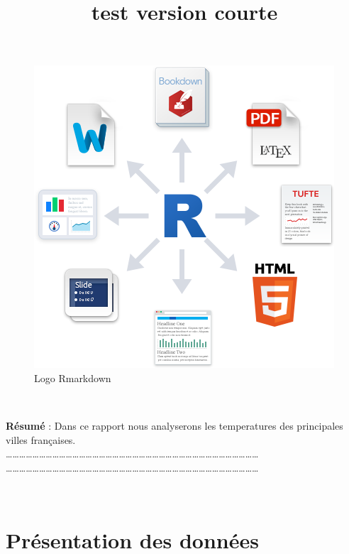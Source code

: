 \documentclass[
]{article}
\title{test version courte}
\author{}
\date{\vspace{-2.5em}}
\begin{document}
\maketitle

{
\setcounter{tocdepth}{3}
\tableofcontents
}
\begin{figure}[h]

{\centering \includegraphics[width=1\linewidth]{rmarkdown} 

}

\caption{Logo Rmarkdown}\label{fig:logo}
\end{figure}

~

\textbf{Résumé} : Dans ce rapport nous analyserons les temperatures des
principales villes françaises.\\
\ldots\ldots\ldots\ldots\ldots\ldots\ldots\ldots\ldots\ldots\ldots\ldots\ldots\ldots\ldots\ldots\ldots\ldots\ldots\ldots\ldots\ldots\ldots\ldots\ldots\ldots\ldots\ldots\ldots\ldots\ldots\ldots\ldots\ldots\ldots\ldots\ldots\ldots{}
\ldots\ldots\ldots\ldots\ldots\ldots\ldots\ldots\ldots\ldots\ldots\ldots\ldots\ldots\ldots\ldots\ldots\ldots\ldots\ldots\ldots\ldots\ldots\ldots\ldots\ldots\ldots\ldots\ldots\ldots\ldots\ldots\ldots\ldots\ldots\ldots\ldots\ldots{}

~

\hypertarget{pruxe9sentation-des-donnuxe9es}{%
\section{\texorpdfstring{\textbf{Présentation des données
}}{Présentation des données }}\label{pruxe9sentation-des-donnuxe9es}}
\end{document}
